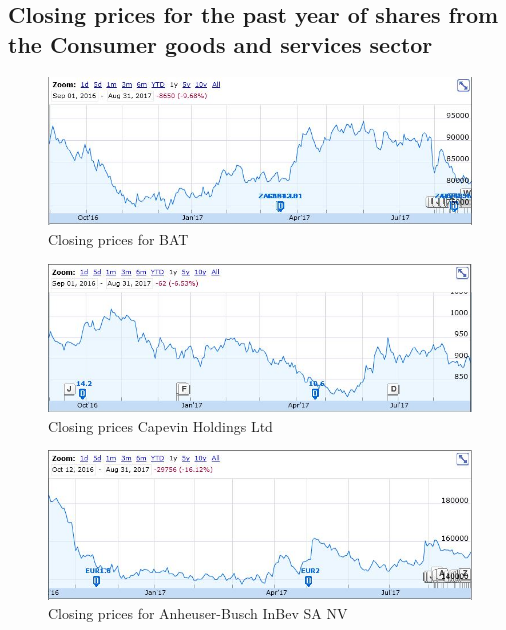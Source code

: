 \documentclass[letterpaper, 10 pt, conference]{ieeeconf}  %
\begin{document}
\label{sec:flowChart}

\subsection{Closing prices for the past year of shares from the Consumer goods and services sector}

\begin{figure}[h!]
\centering
\includegraphics[scale=0.43]{BATSA.JPG}
\caption{Closing prices for BAT \cite{BATSA}}
\label{fig:BASTA}
\end{figure}

\begin{figure}[h!]
\centering
\includegraphics[scale=0.43]{capevin.JPG}
\caption{Closing prices Capevin Holdings Ltd \cite{capevin}}
\label{fig:capevin}
\end{figure}

\begin{figure}[h!]
\centering
\includegraphics[scale=0.43]{inbev.JPG}
\caption{Closing prices for Anheuser-Busch InBev SA NV \cite{inbev}}
\label{fig:inbev}
\end{figure}
\end{document}
